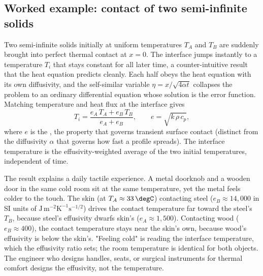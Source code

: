 

\subsection{Worked example: contact of two semi-infinite solids}

Two semi-infinite solids initially at uniform temperatures $T_{A}$
and $T_{B}$ are suddenly brought into perfect thermal contact at
$x = 0$. The interface jumps instantly to a temperature $T_{i}$
that stays constant for all later time, a counter-intuitive result
that the heat equation predicts cleanly. Each half obeys the heat
equation with its own diffusivity, and the self-similar variable
$\eta = x/\sqrt{4 \alpha t}$ collapses the problem to an ordinary
differential equation whose solution is the error function. Matching
temperature and heat flux at the interface gives
\[
T_{i} = \frac{e_{A}\, T_{A} + e_{B}\, T_{B}}{e_{A} + e_{B}}, \qquad e = \sqrt{k\, \rho\, c_{p}},
\]
where $e$ is the , the property that
governs transient surface contact (distinct from the diffusivity
$\alpha$ that governs how fast a profile spreads). The interface
temperature is the effusivity-weighted average of the two initial
temperatures, independent of time.

The result explains a daily tactile experience. A metal doorknob
and a wooden door in the same cold room sit at the same
temperature, yet the metal feels colder to the touch. The skin
(at $T_{A} \approx 33\,\degC$) contacting steel ($e_{B} \approx
14{,}000$ in SI units of
$\text{J}\,\text{m}^{-2}\text{K}^{-1}\text{s}^{-1/2}$)
drives the contact temperature far toward the steel's $T_{B}$,
because steel's effusivity dwarfs skin's ($e_{A} \approx
1{,}500$). Contacting wood ($e_{B} \approx 400$), the contact
temperature stays near the skin's own, because wood's effusivity is
below the skin's. "Feeling cold" is reading the interface
temperature, which the effusivity ratio sets; the room temperature
is identical for both objects. The engineer who designs handles,
seats, or surgical instruments for thermal comfort designs the
effusivity, not the temperature.

